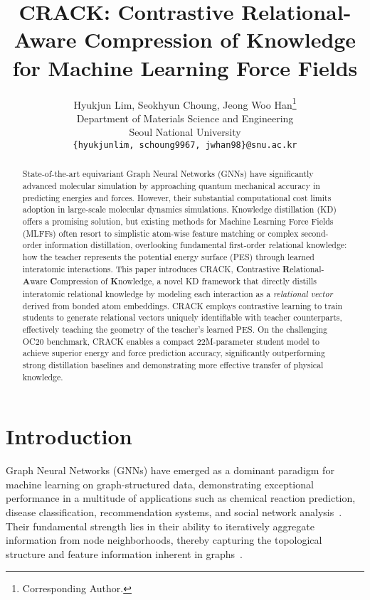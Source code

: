 \documentclass{article}
\title{CRACK: Contrastive Relational-Aware Compression of Knowledge for Machine Learning Force Fields}
\author{
  Hyukjun Lim, Seokhyun Choung, Jeong Woo Han\thanks{Corresponding Author.} \\
  Department of Materials Science and Engineering \\
  Seoul National University \\
  \texttt{\{hyukjunlim, schoung9967, jwhan98\}@snu.ac.kr} \\
}
\begin{document}
\newcommand{\Lcrack}{\mathcal{L}_{\text{CRACK}}}
\newcommand{\Ltcr}{\mathcal{L}_{\text{TCR}}} %
\newcommand{\Lscr}{\mathcal{L}_{\text{SCR}}} %
\newcommand{\Ltask}{\mathcal{L}_{\text{task}}}
\newcommand{\Lnnton}{\mathcal{L}_{\text{n2n}}}
\newcommand{\Ltotal}{\mathcal{L}_{\text{total}}}

\maketitle

\begin{abstract}
State-of-the-art equivariant Graph Neural Networks (GNNs) have significantly advanced molecular simulation by approaching quantum mechanical accuracy in predicting energies and forces. 
However, their substantial computational cost limits adoption in large-scale molecular dynamics simulations. 
Knowledge distillation (KD) offers a promising solution, but existing methods for Machine Learning Force Fields (MLFFs) often resort to simplistic atom-wise feature matching or complex second-order information distillation, overlooking fundamental first-order relational knowledge: how the teacher represents the potential energy surface (PES) through learned interatomic interactions. 
This paper introduces CRACK, \textbf{C}ontrastive \textbf{R}elational-\textbf{A}ware \textbf{C}ompression of \textbf{K}nowledge, a novel KD framework that directly distills interatomic relational knowledge by modeling each interaction as a \emph{relational vector} derived from bonded atom embeddings. 
CRACK employs contrastive learning to train students to generate relational vectors uniquely identifiable with teacher counterparts, effectively teaching the geometry of the teacher's learned PES.
On the challenging OC20 benchmark, CRACK enables a compact 22M-parameter student model to achieve superior energy and force prediction accuracy, significantly outperforming strong distillation baselines and demonstrating more effective transfer of physical knowledge.
\end{abstract}    


\section{Introduction}

Graph Neural Networks (GNNs) have emerged as a dominant paradigm for machine learning on graph-structured data, demonstrating exceptional performance in a multitude of applications such as chemical reaction prediction, disease classification, recommendation systems, and social network analysis~\citep{zhou2020graph, gilmer2017neural, yang2023geometric, lim2025cheapnet}.
Their fundamental strength lies in their ability to iteratively aggregate information from node neighborhoods, thereby capturing the topological structure and feature information inherent in graphs~\citep{wu2020comprehensive, corso2024graph}.
\end{document}

